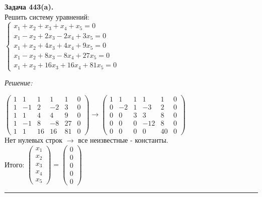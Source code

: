 \documentclass[a4paper, 12pt]{article}
\newenvironment{problem}[2][Задача]
{ \begin{mdframed}[backgroundcolor=gray!10] \textbf{#1 #2.} \\}
{  \end{mdframed}}
\newenvironment{solution}
{\textit{Решение: }}
{\noindent\rule{7in}{1.5pt}}
\begin{document}
\begin{problem}{443(a)}
  Решить систему уравнений:\\
  $\left\{\begin{array}{l}
      x_1+x_2+x_3+x_4+x_5=0\\
      x_1-x_2+2x_3-2x_4+3x_5=0\\
      x_1+x_2+4x_3+4x_4+9x_5=0\\
      x_1-x_2+8x_3-8x_4+27x_5=0\\
      x_1+x_2+16x_3+16x_4+81x_5=0
  \end{array}\right.$

\end{problem}
\begin{solution}

  $
  \left(
    \begin{array}{rrrrrrrr}
      1 &  1 &  1 &  1 &  1 & 0 \\
      1 & -1 &  2 & -2 &  3 & 0 \\
      1 &  1 &  4 &  4 &  9 & 0 \\
      1 & -1 &  8 & -8 & 27 & 0 \\
      1 &  1 & 16 & 16 & 81 & 0
    \end{array}
  \right)
  \rightarrow
  \left(
    \begin{array}{rrrrrrrr}
      1 &  1 & 1 &   1 &  1 & 0 \\
      0 & -2 & 1 &  -3 &  2 & 0 \\
      0 &  0 & 3 &   3 &  8 & 0 \\
      0 &  0 & 0 & -12 &  8 & 0 \\
      0 &  0 & 0 &   0 & 40 & 0
    \end{array}
  \right)
  $
  \\
  Нет нулевых строк $\rightarrow$ все неизвестные - константы. \\
  Итого:
  $
  \left(
    \begin{array}{r}
      x_1 \\
      x_2 \\
      x_3 \\
      x_4 \\
      x_5
    \end{array}
  \right)
  =
  \left(
    \begin{array}{r}
      0 \\
      0 \\
      0 \\
      0 \\
      0
    \end{array}
  \right)
  $

\end{solution}
\end{document}
